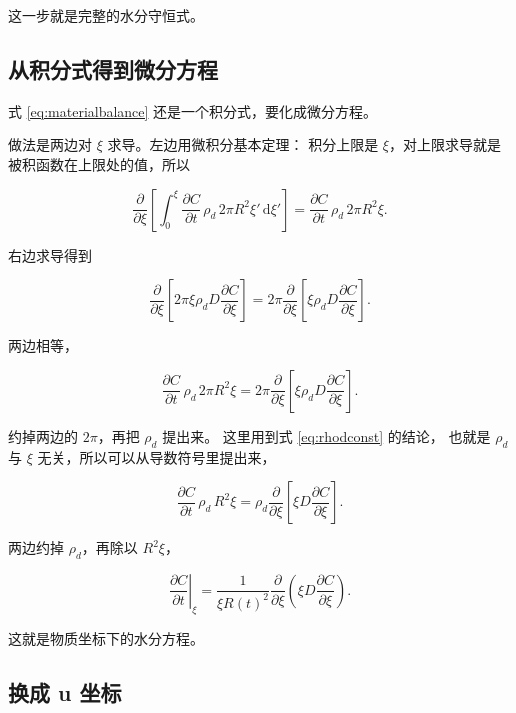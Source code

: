 这一步就是完整的水分守恒式。

\subsection{从积分式得到微分方程}

式 \eqref{eq:materialbalance} 还是一个积分式，要化成微分方程。

做法是两边对 $\xi$ 求导。左边用微积分基本定理：
积分上限是 $\xi$，对上限求导就是被积函数在上限处的值，所以

\begin{equation}
\frac{\partial}{\partial \xi}\left[\int_0^\xi \frac{\partial C}{\partial t}\,\rho_d\,2\pi R^2\xi'\,\mathrm{d}\xi'\right]
= \frac{\partial C}{\partial t}\,\rho_d\,2\pi R^2\xi .
\end{equation}

右边求导得到

\begin{equation}
\frac{\partial}{\partial \xi}\left[2\pi\xi\rho_d D\frac{\partial C}{\partial \xi}\right]
= 2\pi\frac{\partial}{\partial \xi}\left[\xi\rho_d D\frac{\partial C}{\partial \xi}\right] .
\end{equation}

两边相等，

\begin{equation}
\frac{\partial C}{\partial t}\,\rho_d\,2\pi R^2\xi
= 2\pi\frac{\partial}{\partial \xi}\left[\xi\rho_d D\frac{\partial C}{\partial \xi}\right] .
\end{equation}

约掉两边的 $2\pi$，再把 $\rho_d$ 提出来。
这里用到式 \eqref{eq:rhodconst} 的结论，
也就是 $\rho_d$ 与 $\xi$ 无关，所以可以从导数符号里提出来，

\begin{equation}
\frac{\partial C}{\partial t}\,\rho_d\,R^2\xi
= \rho_d\frac{\partial}{\partial \xi}\left[\xi D\frac{\partial C}{\partial \xi}\right] .
\end{equation}

两边约掉 $\rho_d$，再除以 $R^2\xi$，

\begin{equation}
\boxed{\;
\left.\frac{\partial C}{\partial t}\right|_\xi
= \frac{1}{\xi R(t)^2}\frac{\partial}{\partial \xi}\left(\xi D\frac{\partial C}{\partial \xi}\right).
\;}
\label{eq:material}
\end{equation}

这就是物质坐标下的水分方程。

\subsection{换成 u 坐标}

